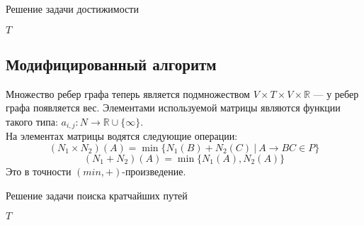 \documentclass[14pt]{matmex-diploma}
\theoremstyle{definition}
\begin{document}
        \begin{algorithm}[H]
        \begin{algorithmic}[1]
        \caption{Решение задачи достижимости}
        \label{alg:graphParse}
            \EndFor    
            \EndWhile
        \State \Return $T$
        \EndFunction
        \end{algorithmic}
        \end{algorithm}
    \subsection{Модифицированный алгоритм}
        Множество ребер графа теперь является подмножеством $V \times T \times V \times \mathbb{R}$ --- у ребер графа появляется вес. Элементами используемой матрицы являются функции такого типа: $a_{i,j}: N\rightarrow\mathbb{R}\cup\{\infty\}$.\\
        На элементах матрицы водятся следующие операции:
        \begin{equation*}
            (N_1 \times N_2)(A) = \min\{N_1(B) + N_2(C)~|~A \rightarrow BC \in P\}
        \end{equation*}
        \begin{equation*}
            (N_1 + N_2)(A) = \min\{N_1(A), N_2(A)\}
        \end{equation*}
        Это в точности $(min, +)$-произведение.
        
        \begin{algorithm}[H]
        \begin{algorithmic}[1]
        \caption{Решение задачи поиска кратчайших путей}
        \label{alg:graphParseShortest}
                \EndFor
            \EndFor    
            \EndWhile
        \State \Return $T$
        \EndFunction
        \end{algorithmic}
        \end{algorithm}
\end{document}
